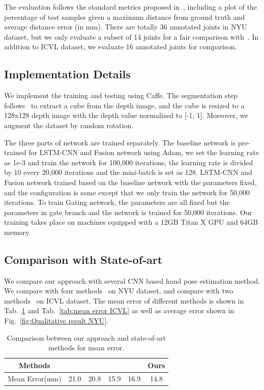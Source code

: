 \documentclass[journal,comsoc]{IEEEtran}
\let\MYoriglatexcaption\caption
\renewcommand{\caption}[2][\relax]{\MYoriglatexcaption[#2]{#2}}
\begin{document}
The evaluation follows the standard metrics proposed in~\cite{tompson2014real}, including a plot of the percentage of test samples given a maximum
distance from ground truth and average distance error (in mm). There are totally 36 annotated joints in NYU dataset, but we only evaluate a subset of 14 joints
for a fair comparison with~\cite{tompson2014real,oberweger2015hands,oberweger2015training}. In addition to ICVL dataset, we evaluate 16 annotated joints for
comparison.
\subsection{Implementation Details}\label{sec:implementation}
We implement the training and testing using Caffe\cite{jia2014caffe}. The segmentation step follows~\cite{oberweger2015hands} to extract a cube from the depth image,
and the cube is resized to a 128x128 depth image with the depth value normalized to [-1, 1]. Moreover, we augment the dataset by random rotation.

The three parts of network are trained separately. The baseline network is pre-trained for LSTM-CNN and Fusion network using Adam, we set the learning rate as 1e-3
and train the network for 100,000 iterations, the learning rate is divided by 10 every 20,000 iterations and the mini-batch is set as 128. LSTM-CNN and Fusion network
trained based on the baseline network with the parameters fixed, and the configuration is same except that we only train the network for 50,000 iterations. To train
Gating network, the parameters are all fixed but the parameters in gate branch and the network is trained for 50,000 iterations. Our training takes place on machines
equipped with a 12GB Titan X GPU and 64GB memory.
\subsection{Comparison with State-of-art}\label{sec:comparison}
We compare our approach with several CNN based hand pose estimation method. We compare with four methods~\cite{tompson2014real}\cite{oberweger2015hands}
\cite{oberweger2015training}\cite{zhou2016model} on NYU dataset, and compare with two methods~\cite{oberweger2015hands}\cite{zhou2016model} on ICVL dataset.
The mean error of different methods is shown in Tab.~\ref{tab:mean error NYU} and Tab.~\ref{tab:mean error ICVL} as well as average error shown in Fig.~\ref{fig:Qualitative result NYU}.

\begin{table}[htbp]\footnotesize
\centering
    \begin{tabular}{|c|c|c|c|c|c|}
    \hline
    Methods        &\cite{tompson2014real} &\cite{oberweger2015hands} &\cite{oberweger2015training} &\cite{zhou2016model} &Ours\\
    \hline
    Mean Error(mm) &21.0                   &20.8                      &15.9                         &16.9                 &14.8\\
    \hline
\end{tabular}
\vspace{1em}
\caption{Comparison between our approach and state-of-art methods for mean error.}
\label{tab:mean error NYU}
\end{table}
\end{document}
